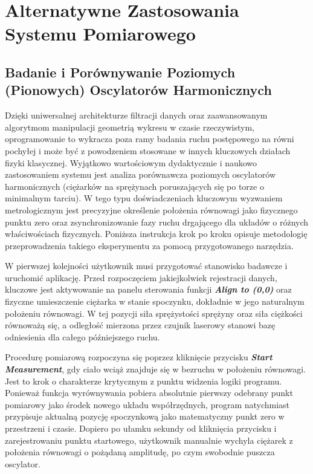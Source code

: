 \documentclass[a4paper,12pt]{article}
\begin{document}
\newpage


\section{Alternatywne Zastosowania Systemu Pomiarowego}

\subsection{Badanie i Porównywanie Poziomych (Pionowych) Oscylatorów Harmonicznych}

Dzięki uniwersalnej architekturze filtracji danych oraz zaawansowanym algorytmom manipulacji geometrią wykresu w czasie rzeczywistym, oprogramowanie to wykracza poza ramy badania ruchu postępowego na równi pochyłej i może być z powodzeniem stosowane w innych kluczowych działach fizyki klasycznej. Wyjątkowo wartościowym dydaktycznie i naukowo zastosowaniem systemu jest analiza porównawcza poziomych oscylatorów harmonicznych (ciężarków na sprężynach poruszających się po torze o minimalnym tarciu). W tego typu doświadczeniach kluczowym wyzwaniem metrologicznym jest precyzyjne określenie położenia równowagi jako fizycznego punktu zero oraz zsynchronizowanie fazy ruchu drgającego dla układów o różnych właściwościach fizycznych. Poniższa instrukcja krok po kroku opisuje metodologię przeprowadzenia takiego eksperymentu za pomocą przygotowanego narzędzia.

\vspace{0.3cm}
\noindent W pierwszej kolejności użytkownik musi przygotować stanowisko badawcze i uruchomić aplikację. Przed rozpoczęciem jakiejkolwiek rejestracji danych, kluczowe jest aktywowanie na panelu sterowania funkcji \textbf{\textit{Align to (0,0)}} oraz fizyczne umieszczenie ciężarka w stanie spoczynku, dokładnie w jego naturalnym położeniu równowagi. W tej pozycji siła sprężystości sprężyny oraz siła ciężkości równoważą się, a odległość mierzona przez czujnik laserowy stanowi bazę odniesienia dla całego późniejszego ruchu.

\vspace{0.3cm}
\noindent Procedurę pomiarową rozpoczyna się poprzez kliknięcie przycisku \textbf{\textit{Start Measurement}}, gdy ciało wciąż znajduje się w bezruchu w położeniu równowagi. Jest to krok o charakterze krytycznym z punktu widzenia logiki programu. Ponieważ funkcja wyrównywania pobiera absolutnie pierwszy odebrany punkt pomiarowy jako środek nowego układu współrzędnych, program natychmiast przypisuje aktualną pozycję spoczynkową jako matematyczny punkt zero w przestrzeni i czasie. Dopiero po ułamku sekundy od kliknięcia przycisku i zarejestrowaniu punktu startowego, użytkownik manualnie wychyla ciężarek z położenia równowagi o pożądaną amplitudę, po czym swobodnie puszcza oscylator.
\end{document}
